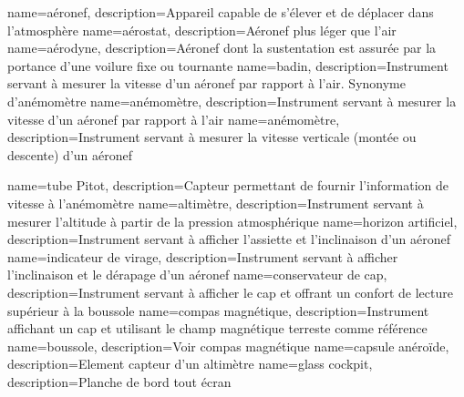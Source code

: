 {
    name=aéronef,
    description={Appareil capable de s'élever et de déplacer dans l'atmosphère}
}
{
    name=aérostat,
    description={Aéronef plus léger que l'air}
}
{
    name=aérodyne,
    description={Aéronef dont la sustentation est assurée par la portance d'une voilure fixe ou tournante}
}
{
    name=badin,
    description={Instrument servant à mesurer la vitesse d'un aéronef par rapport à l'air. Synonyme d'anémomètre}
}
{
    name=anémomètre,
    description={Instrument servant à mesurer la vitesse d'un aéronef par rapport à l'air}
}
{
    name=anémomètre,
    description={Instrument servant à mesurer la vitesse verticale (montée ou descente) d'un aéronef}
}

{
    name=tube Pitot,
    description={Capteur permettant de fournir l'information de vitesse à l'anémomètre}
}
{
    name=altimètre,
    description={Instrument servant à mesurer l'altitude à partir de la pression atmosphérique}
}
{
    name=horizon artificiel,
    description={Instrument servant à afficher l'assiette et l'inclinaison d'un aéronef}
}
{
    name=indicateur de virage,
    description={Instrument servant à afficher l'inclinaison et le dérapage d'un aéronef}
}
{
    name=conservateur de cap,
    description={Instrument servant à afficher le cap et offrant un confort de lecture supérieur à la boussole}
}
{
    name=compas magnétique,
    description={Instrument affichant un cap et utilisant le champ magnétique terreste comme référence}
}
{
    name=boussole,
    description={Voir compas magnétique}
}
{
    name=capsule anéroïde,
    description={Element capteur d'un altimètre}
}
{
    name=glass cockpit,
    description={Planche de bord tout écran}
}





